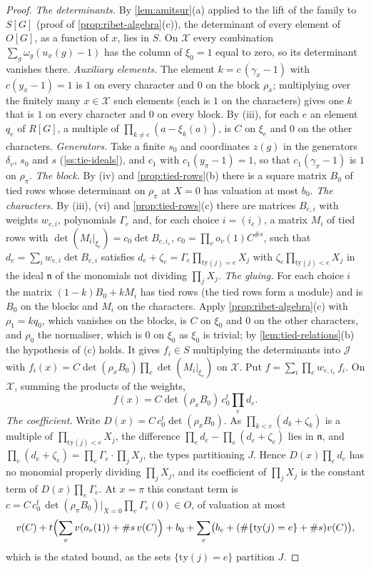 \begin{proof}
\emph{The determinants.} By \cref{lem:amitsur}(a) applied to the lift of the family to $S[G]$ (proof of \cref{prop:ribet-algebra}(c)), the determinant of every element of $O[G]$, as a function of $x$, lies in $S$. On $\mathcal X$ every combination
$\sum_g\omega_g(u_x(g)-1)$ has the column of $\xi_0=1$ equal to zero, so its determinant vanishes there. \emph{Auxiliary elements.} The element $k=c\,(\gamma_x-1)$ with $c(y_x-1)=1$ is $1$ on every character and $0$ on the block $\rho_x$; multiplying over
the finitely many $x\in\mathcal X$ such elements (each is $1$ on the characters) gives one $k$ that is $1$ on every character and $0$ on every block. By (iii), for each $e$ an element $q_e$ of $R[G]$, a multiple of $\prod_{k\ne e}(a-\xi_k(a))$, is $C$ on $\xi_e$ and
$0$ on the other characters. \emph{Generators.} Take a finite $s_0$ and coordinates $z(g)$ in the generators $\delta_v$, $s_0$ and $s$ (\cref{ss:tie-ideals}), and $c_1$ with $c_1(y_\pi-1)=1$, so that $c_1(\gamma_\pi-1)$ is $1$ on $\rho_\pi$.
\emph{The block.} By (iv) and \cref{prop:tied-rows}(b) there is a square matrix $B_0$ of tied rows whose determinant on $\rho_\pi$ at $X=0$ has valuation at most $b_0$. \emph{The characters.} By (iii), (vi) and \cref{prop:tied-rows}(c) there are matrices
$B_{e,i}$ with weights $w_{e,i}$, polynomials $\Gamma_e$ and, for each choice $i=(i_e)$, a matrix $M_i$ of tied rows with $\det(M_i|_{\xi_e})=c_0\det B_{e,i_e}$, $c_0=\prod_vo_v(1)C^{\#s}$, such that $d_e=\sum_iw_{e,i}\det B_{e,i}$ satisfies
$d_e+\zeta_e=\Gamma_e\prod_{\mathrm{ty}(j)=e}X_j$ with $\zeta_e\prod_{\mathrm{ty}(j)<e}X_j$ in the ideal $\mathfrak n$ of the monomials not dividing $\prod_jX_j$.
\emph{The gluing.} For each choice $i$ the matrix $(1-k)B_0+kM_i$ has tied rows (the tied rows form a module) and is $B_0$ on the blocks and $M_i$ on the characters. Apply \cref{prop:ribet-algebra}(c) with $\rho_1=kq_0$, which vanishes on the blocks,
is $C$ on $\xi_0$ and $0$ on the other characters, and $\rho_0$ the normaliser, which is $0$ on $\xi_0$ as $\xi_0$ is trivial; by \cref{lem:tied-relations}(b) the hypothesis of (c) holds. It gives $f_i\in S$ multiplying the determinants into $\mathcal J$
with $f_i(x)=C\det(\rho_xB_0)\prod_e\det(M_i|_{\xi_e})$ on $\mathcal X$. Put $f=\sum_i\prod_ew_{e,i_e}\,f_i$. On $\mathcal X$, summing the products of the weights,
\[
  f(x)=C\det(\rho_xB_0)\,c_0^t\prod_e d_e .
\]
\emph{The coefficient.} Write $D(x)=C\,c_0^t\det(\rho_xB_0)$. As $\prod_{k<e}(d_k+\zeta_k)$ is a multiple of $\prod_{\mathrm{ty}(j)<e}X_j$, the difference $\prod_ed_e-\prod_e(d_e+\zeta_e)$ lies in $\mathfrak n$, and $\prod_e(d_e+\zeta_e)=\prod_e\Gamma_e\cdot\prod_jX_j$, the types
partitioning $J$. Hence $D(x)\prod_ed_e$ has no monomial properly dividing $\prod_jX_j$, and its coefficient of $\prod_jX_j$ is the constant term of $D(x)\prod_e\Gamma_e$. At $x=\pi$ this constant term is
$c=C\,c_0^t\,\det(\rho_\pi B_0)|_{X=0}\prod_e\Gamma_e(0)\in O$, of valuation at most
\[
  v(C)+t\Bigl(\sum_vv(o_v(1))+\#s\,v(C)\Bigr)+b_0+\sum_e\bigl(b_e+(\#\{\mathrm{ty}(j)=e\}+\#s)v(C)\bigr),
\]
which is the stated bound, as the sets $\{\mathrm{ty}(j)=e\}$ partition $J$.
\end{proof}

